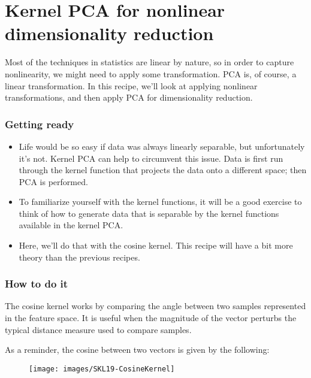 \documentclass[SKL-MASTER.tex]{subfiles}
\begin{document}
	\Large
\section{Kernel PCA for nonlinear dimensionality
reduction}
Most of the techniques in statistics are linear by nature, so in order to capture nonlinearity,
we might need to apply some transformation. PCA is, of course, a linear transformation.
In this recipe, we'll look at applying nonlinear transformations, and then apply PCA for
dimensionality reduction.
\subsubsection{Getting ready}
\begin{itemize}
\item Life would be so easy if data was always linearly separable, but unfortunately it's not.
Kernel PCA can help to circumvent this issue. Data is first run through the kernel function
that projects the data onto a different space; then PCA is performed.
\item To familiarize yourself with the kernel functions, it will be a good exercise to think of
how to generate data that is separable by the kernel functions available in the kernel PCA.
\item Here, we'll do that with the cosine kernel. This recipe will have a bit more theory than the
previous recipes.
\end{itemize}


\subsubsection*{How to do it}
The cosine kernel works by comparing the angle between two samples represented in the
feature space. It is useful when the magnitude of the vector perturbs the typical distance
measure used to compare samples.

As a reminder, the cosine between two vectors is given by the following:
\begin{figure}
\centering
\texttt{[image: images/SKL19-CosineKernel]}
\caption{}
\label{fig:SKL19-CosineKernel}
\end{figure}
\end{document}
